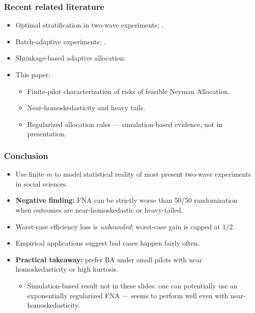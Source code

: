 \documentclass[aspectratio=169, 10pt]{beamer}
\theoremstyle{definition}
\theoremstyle{plain}
\begin{document}
\begin{frame}
\frametitle{Recent related literature}
\begin{itemize}
  \item Optimal stratification in two-wave experiments:
    \citet{2023tabord-meehanStratificationTreesAdaptive,%
    2021cytrynbaumDesigningRepresentativeBalanced,%
    2023cytrynbaumOptimalStratificationSurvey,%
    2022baiOptimalityMatchedPair}.
    \vfill
  \item Batch-adaptive experiments: \citet{2023blackwellBatchAdaptiveDesigns}.
    \vfill
  \item Shrinkage-based adaptive allocation:
    \citet{2026rosenmanAdaptiveExperimentalDesign}
    \vfill
  \item This paper:
    \vfill
    \begin{itemize}
      \item Finite-pilot characterization of risks of feasible Neyman
        Allocation.
        \vfill
      \item Near-homoskedasticity and heavy tails.
        \vfill
      \item Regularized allocation rules --- simulation-based evidence, not in
        presentation.
    \end{itemize}
\end{itemize}
\end{frame}

\begin{frame}
\frametitle{Conclusion}
\begin{itemize}
  \item Use finite \(m\) to model statistical reality of most present two-wave
    experiments in social sciences.
    \vfill
  \item \textbf{Negative finding:} FNA can be strictly worse than 50/50
    randomization when outcomes are near-homoskedastic or heavy-tailed.
    \vfill
  \item Worst-case efficiency loss is \emph{unbounded}; worst-case gain is
    capped at \(1/2\).
    \vfill
  \item Empirical applications suggest bad cases happen fairly often.
    \vfill
  \item \textbf{Practical takeaway:} prefer BA under small pilots with near
    homoskedasticity or high kurtosis.
    \vfill
    \begin{itemize}
      \item Simulation-based result not in these slides: one can potentially use
        an exponentially regularized FNA --- seems to perform well even with
        near-homoskedasticity.
    \end{itemize}
\end{itemize}
\end{frame}
\end{document}
